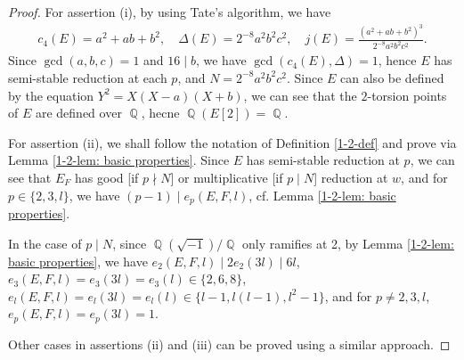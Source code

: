 \documentclass[a4paper, 12pt]{article}
\DeclareMathOperator{\Q}{\mathbb{Q}}
\numberwithin{equation}{section}
\theoremstyle{definition}
\begin{document}
\begin{proof}
For assertion (i), by using Tate's algorithm, we have 
\small\begin{align*}
c_4(E) = a^2 + ab + b^2, \quad
\Delta(E) = 2^{-8}a^2b^2c^2, \quad 
j(E) = \frac{(a^2+ab+b^2)^3}{2^{-8}a^2b^2c^2}.
\end{align*}\normalsize
Since $\gcd(a,b,c) = 1$ and $16\mid b$, we have $\gcd(c_4(E), \Delta) = 1$, hence $E$ has semi-stable reduction at each $p$, and $N=2^{-8}a^2b^2c^2$. 
Since $E$ can also be defined by the equation $Y^2 = X(X-a)(X+b)$, we can see that the $2$-torsion  points of $E$ are defined over $\Q$, hecne $\Q(E[2]) = \Q$.

For assertion (ii), we shall follow the notation of Definition \ref{1-2-def} and prove via Lemma \ref{1-2-lem: basic properties}.
Since $E$ has semi-stable reduction at $p$, we can see that $E_F$ has good [if $p\nmid N$] or multiplicative [if $p\mid N$] reduction at $w$, and for $p\in\{2,3,l\}$, we have $(p-1) \mid e_p(E,F,l)$, cf.  Lemma \ref{1-2-lem: basic properties}.

In the case of $p\mid N$, since $\Q(\sqrt{-1}) / \Q$ only ramifies at 2, by Lemma \ref{1-2-lem: basic properties}, 
we have $e_2(E,F,l) \mid 2 e_2(3l) \mid 6l$, 
$e_3(E,F,l) = e_3(3l) = e_3(l) \in \{2,6,8\}$, $e_l(E,F,l) = e_l(3l) = e_l(l) \in \{l-1, l(l-1), l^2-1\}$, and for $p\neq 2,3,l$, $e_p(E,F,l) = e_p(3l) = 1$.

Other cases in assertions (ii) and (iii) can be proved using a similar approach.
\end{proof}
\end{document}
